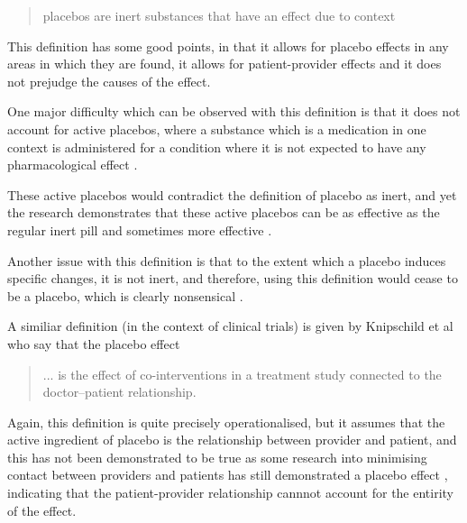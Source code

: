 \begin{quotation}
  placebos are inert substances that have an effect due to context
\end{quotation}

This definition has some good points, in that it allows for placebo effects in any areas in which they are found, it allows for patient-provider effects and it does not prejudge the causes of the effect. 

One major difficulty which can be observed with this definition is that it does not account for active placebos, where a substance which is a medication in one context is administered for a condition where it is not expected to have any pharmacological effect\cite{Kirsch1998} . 

These active placebos would contradict the definition of placebo as inert, and yet the research demonstrates that these active placebos can be as effective as the regular inert pill \cite{Flaten2004} and sometimes more effective \cite{Kirsch2002a}. 

Another issue with this definition is that to the extent which a placebo induces specific changes, it is not inert, and therefore, using this definition would cease to be a placebo, which is clearly nonsensical \cite{Moerman2002b}.

A similiar definition (in the context of clinical trials) is given by Knipschild et al \cite{Knipschild2005} who say that the placebo effect

\begin{quotation}
... is the effect of co-interventions in a
treatment study connected to the doctor--patient relationship.
\end{quotation}

Again, this definition is quite precisely operationalised, but it assumes that the active ingredient of placebo is the relationship between provider and patient, and this has not been demonstrated to be true as some research into minimising contact between providers and patients has still demonstrated a placebo effect \cite{Hyland2006}, indicating that the patient-provider relationship cannnot account for the entirity of the effect.  





